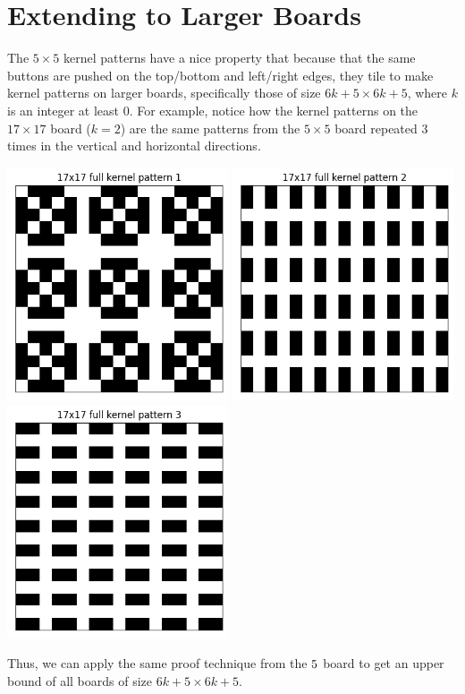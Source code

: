 \documentclass{article}
\begin{document}
	\section{Extending to Larger Boards}
	The $5 \times 5$ kernel patterns have a nice property that because that the same buttons are pushed on the top/bottom and left/right edges, they tile to make kernel patterns on larger boards, specifically those of size $6k + 5 \times 6k + 5$, where $k$ is an integer at least 0.
	For example, notice how the kernel patterns on the $17 \times 17$ board ($k = 2$) are the same patterns from the $5 \times 5$ board repeated 3 times in the vertical and horizontal directions.
	\begin{center}
		\includegraphics[width=0.49\textwidth]{../code/serialization/kernels/17x17/full/17x17_kernel_full_1.png}
		\includegraphics[width=0.49\textwidth]{../code/serialization/kernels/17x17/full/17x17_kernel_full_2.png}
		\includegraphics[width=0.49\textwidth]{../code/serialization/kernels/17x17/full/17x17_kernel_full_3.png}
	\end{center}
	Thus, we can apply the same proof technique from the $5 \time 5$ board to get an upper bound of all boards of size $6k + 5 \times 6k + 5$.
	
\end{document}
